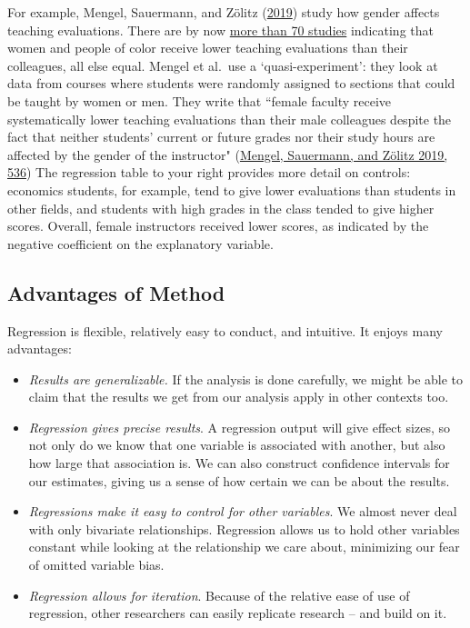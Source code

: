 \documentclass{book}
\begin{document}
For example, Mengel, Sauermann, and Zölitz
(\protect\hyperlink{ref-mengelGenderBiasTeaching2019}{2019}) study how gender
affects teaching evaluations. There are by now
\href{http://www.rebeccakreitzer.com/summaries-of-research-articles/}{more
than 70 studies} indicating that women and people of color receive lower
teaching evaluations than their colleagues, all else equal. Mengel et al.~use
a `quasi-experiment': they look at data from courses where students were
randomly assigned to sections that could be taught by women or men. They write
that ``female faculty receive systematically lower teaching evaluations than
their male colleagues despite the fact that neither students' current or
future grades nor their study hours are affected by the gender of the
instructor" (\protect\hyperlink{ref-mengelGenderBiasTeaching2019}{Mengel,
Sauermann, and Zölitz 2019, 536}) The regression table to your right provides
more detail on controls: economics students, for example, tend to give lower
evaluations than students in other fields, and students with high grades in
the class tended to give higher scores. Overall, female instructors received
lower scores, as indicated by the negative coefficient on the explanatory
variable.

\hypertarget{advantages-of-method-2}{%
\subsection{Advantages of Method}\label{advantages-of-method-2}}

Regression is flexible, relatively easy to conduct, and intuitive. It enjoys
many advantages:

\begin{itemize}
\item
  \emph{Results are generalizable.} If the analysis is done carefully, we
  might be able to claim that the results we get from our analysis apply in
  other contexts too.
\item
  \emph{Regression gives precise results}. A regression output will give
  effect sizes, so not only do we know that one variable is associated with
  another, but also how large that association is. We can also construct
  confidence intervals for our estimates, giving us a sense of how certain we
  can be about the results.
\item
  \emph{Regressions make it easy to control for other variables}. We almost
  never deal with only bivariate relationships. Regression allows us to hold
  other variables constant while looking at the relationship we care about,
  minimizing our fear of omitted variable bias.
\item
  \emph{Regression allows for iteration}. Because of the relative ease of use
  of regression, other researchers can easily replicate research -- and build
  on it.
\end{itemize}
\end{document}
